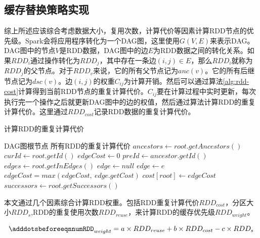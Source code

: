 \subsection{缓存替换策略实现}

综上所述应该综合考虑数据大小，复用次数，计算代价等因素计算RDD节点的优先级。Spark会将应用程序转化为一个DAG图，这里使用$G(V, E)$来表示DAG。DAG图中的节点$V$是RDD数据，DAG图中的边$E$为RDD数据之间的转化关系。如果$RDD_i$通过操作转化为$RDD_j$，其中存在一条边$(i, j)\in E$，那么$RDD_i$就称为$RDD_j$的父节点。对于$RDD_v$来说，它的所有父节点记为$anc(v)$。它的所有后继节点记为$dsc(v)$。边$(i,j)$的权重$C_{ij}$为计算开销。然后可以通过算法\ref{alg:rdd-cost}计算得到当前RDD节点的重复计算代价。$C_{ij}$要在计算过程中实时更新，每次执行完一个操作之后就更新DAG图中的边的权值，然后通过算法计算RDD的重复计算代价。这里通过$RDD_{cost}$记录RDD数据的重复计算代价。

\begin{algorithm}  
    \caption{计算RDD的重复计算代价}  
    \begin{algorithmic}[1] %
        \Require DAG图根节点
        \Ensure 所有RDD的重复计算代价
            \State $ancestors \gets root.getAncestors()$
            \State $curId \gets root.getId()$
            \State $edgeCost \gets 0$
                \State $preId \gets ancestor.getId()$
                \State $edges \gets root.getInEdges()$
                \State $edge \gets null$
                        \State $edge \gets e$
                    \EndIf
                \EndFor
                \State $edgeCost = max(edgeCost, \ edge.getCost)$
            \EndFor
            \State $cost[root] \gets edgeCost$
            \State $successors \gets root.getSuccessors()$
                \State {}
            \EndFor
        \EndFunction
    \end{algorithmic}
    \label{alg:rdd-cost}
\end{algorithm}

本文通过几个因素综合计算RDD权重。包括RDD重复计算代价$RDD_{cost}$，分区大小$RDD_s$,RDD的重复使用次数$RDD_{reuse}$，来计算RDD的缓存优先级$RDD_{weight}$。

\begin{equation} \label{eq:weight}
    \adddotsbeforeeqnnum%
    RDD_{weight}=a \times RDD_{reuse} + b \times RDD_{cost} - c \times RDD_{s}
\end{equation}

